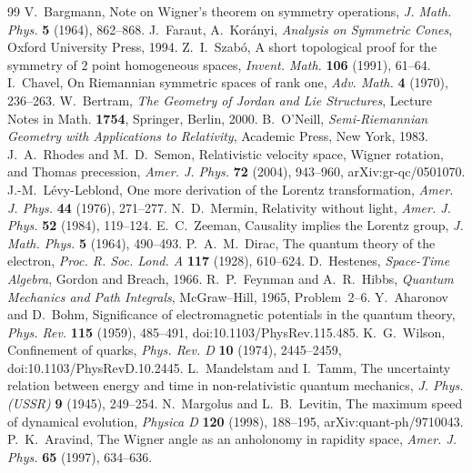 \documentclass[11pt,reqno]{amsart}
\theoremstyle{definition}
\theoremstyle{remark}
\numberwithin{equation}{section}
\begin{document}
\begin{thebibliography}{99}
 V.~Bargmann, Note on Wigner's theorem on symmetry operations, \emph{J. Math. Phys.} \textbf{5} (1964), 862--868.
 J.~Faraut, A.~Kor\'anyi, \emph{Analysis on Symmetric Cones}, Oxford University Press, 1994.
 Z.~I.~Szab\'o, A short topological proof for the symmetry of $2$ point homogeneous spaces, \emph{Invent. Math.} \textbf{106} (1991), 61--64.
 I.~Chavel, On Riemannian symmetric spaces of rank one, \emph{Adv. Math.} \textbf{4} (1970), 236--263.
 W.~Bertram, \emph{The Geometry of Jordan and Lie Structures}, Lecture Notes in Math. \textbf{1754}, Springer, Berlin, 2000.
 B.~O'Neill, \emph{Semi-Riemannian Geometry with Applications to Relativity}, Academic Press, New York, 1983.
 J.~A.~Rhodes and M.~D.~Semon, Relativistic velocity space, Wigner rotation, and Thomas precession, \emph{Amer. J. Phys.} \textbf{72} (2004), 943--960, arXiv:gr-qc/0501070.
 J.-M.~L\'evy-Leblond, One more derivation of the Lorentz transformation, \emph{Amer. J. Phys.} \textbf{44} (1976), 271--277.
 N.~D.~Mermin, Relativity without light, \emph{Amer. J. Phys.} \textbf{52} (1984), 119--124.
 E.~C.~Zeeman, Causality implies the Lorentz group, \emph{J. Math. Phys.} \textbf{5} (1964), 490--493.
 P.~A.~M.~Dirac, The quantum theory of the electron, \emph{Proc. R. Soc. Lond. A} \textbf{117} (1928), 610--624.
 D.~Hestenes, \emph{Space-Time Algebra}, Gordon and Breach, 1966.
 R.~P.~Feynman and A.~R.~Hibbs, \emph{Quantum Mechanics and Path Integrals}, McGraw--Hill, 1965, Problem~2--6.
 Y.~Aharonov and D.~Bohm, Significance of electromagnetic potentials in the quantum theory, \emph{Phys. Rev.} \textbf{115} (1959), 485--491, doi:10.1103/PhysRev.115.485.
 K.~G.~Wilson, Confinement of quarks, \emph{Phys. Rev. D} \textbf{10} (1974), 2445--2459, doi:10.1103/PhysRevD.10.2445.
 L.~Mandelstam and I.~Tamm, The uncertainty relation between energy and time in non-relativistic quantum mechanics, \emph{J. Phys. (USSR)} \textbf{9} (1945), 249--254.
 N.~Margolus and L.~B.~Levitin, The maximum speed of dynamical evolution, \emph{Physica D} \textbf{120} (1998), 188--195, arXiv:quant-ph/9710043.
 P.~K.~Aravind, The Wigner angle as an anholonomy in rapidity space, \emph{Amer. J. Phys.} \textbf{65} (1997), 634--636.

\end{thebibliography}
\end{document}
